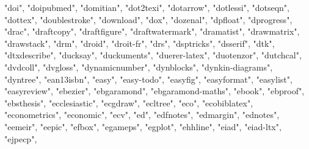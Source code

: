 \documentclass[
]{article}
\newenvironment{Shaded}{\begin{snugshade}}{\end{snugshade}}
\newcommand{\NormalTok}[1]{#1}
\newcommand{\StringTok}[1]{\textcolor[rgb]{0.31,0.60,0.02}{#1}}
\begin{document}
\begin{Shaded}
\begin{Highlighting}[]
\StringTok{"doi"}\NormalTok{, }\StringTok{"doipubmed"}\NormalTok{, }\StringTok{"domitian"}\NormalTok{, }\StringTok{"dot2texi"}\NormalTok{, }\StringTok{"dotarrow"}\NormalTok{, }\StringTok{"dotlessi"}\NormalTok{, }
\StringTok{"dotseqn"}\NormalTok{, }\StringTok{"dottex"}\NormalTok{, }\StringTok{"doublestroke"}\NormalTok{, }\StringTok{"download"}\NormalTok{, }\StringTok{"dox"}\NormalTok{, }\StringTok{"dozenal"}\NormalTok{, }
\StringTok{"dpfloat"}\NormalTok{, }\StringTok{"dprogress"}\NormalTok{, }\StringTok{"drac"}\NormalTok{, }\StringTok{"draftcopy"}\NormalTok{, }\StringTok{"draftfigure"}\NormalTok{, }\StringTok{"draftwatermark"}\NormalTok{, }
\StringTok{"dramatist"}\NormalTok{, }\StringTok{"drawmatrix"}\NormalTok{, }\StringTok{"drawstack"}\NormalTok{, }\StringTok{"drm"}\NormalTok{, }\StringTok{"droid"}\NormalTok{, }\StringTok{"droit{-}fr"}\NormalTok{, }
\StringTok{"drs"}\NormalTok{, }\StringTok{"dsptricks"}\NormalTok{, }\StringTok{"dsserif"}\NormalTok{, }\StringTok{"dtk"}\NormalTok{, }\StringTok{"dtxdescribe"}\NormalTok{, }\StringTok{"ducksay"}\NormalTok{, }
\StringTok{"duckuments"}\NormalTok{, }\StringTok{"duerer{-}latex"}\NormalTok{, }\StringTok{"duotenzor"}\NormalTok{, }\StringTok{"dutchcal"}\NormalTok{, }\StringTok{"dvdcoll"}\NormalTok{, }
\StringTok{"dvgloss"}\NormalTok{, }\StringTok{"dynamicnumber"}\NormalTok{, }\StringTok{"dynblocks"}\NormalTok{, }\StringTok{"dynkin{-}diagrams"}\NormalTok{, }\StringTok{"dyntree"}\NormalTok{, }
\StringTok{"ean13isbn"}\NormalTok{, }\StringTok{"easy"}\NormalTok{, }\StringTok{"easy{-}todo"}\NormalTok{, }\StringTok{"easyfig"}\NormalTok{, }\StringTok{"easyformat"}\NormalTok{, }\StringTok{"easylist"}\NormalTok{, }
\StringTok{"easyreview"}\NormalTok{, }\StringTok{"ebezier"}\NormalTok{, }\StringTok{"ebgaramond"}\NormalTok{, }\StringTok{"ebgaramond{-}maths"}\NormalTok{, }\StringTok{"ebook"}\NormalTok{, }
\StringTok{"ebproof"}\NormalTok{, }\StringTok{"ebsthesis"}\NormalTok{, }\StringTok{"ecclesiastic"}\NormalTok{, }\StringTok{"ecgdraw"}\NormalTok{, }\StringTok{"ecltree"}\NormalTok{, }
\StringTok{"eco"}\NormalTok{, }\StringTok{"ecobiblatex"}\NormalTok{, }\StringTok{"econometrics"}\NormalTok{, }\StringTok{"economic"}\NormalTok{, }\StringTok{"ecv"}\NormalTok{, }\StringTok{"ed"}\NormalTok{, }
\StringTok{"edfnotes"}\NormalTok{, }\StringTok{"edmargin"}\NormalTok{, }\StringTok{"ednotes"}\NormalTok{, }\StringTok{"eemeir"}\NormalTok{, }\StringTok{"eepic"}\NormalTok{, }\StringTok{"efbox"}\NormalTok{, }
\StringTok{"egameps"}\NormalTok{, }\StringTok{"egplot"}\NormalTok{, }\StringTok{"ehhline"}\NormalTok{, }\StringTok{"eiad"}\NormalTok{, }\StringTok{"eiad{-}ltx"}\NormalTok{, }\StringTok{"ejpecp"}\NormalTok{, }

\end{Highlighting}
\end{Shaded}
\end{document}
